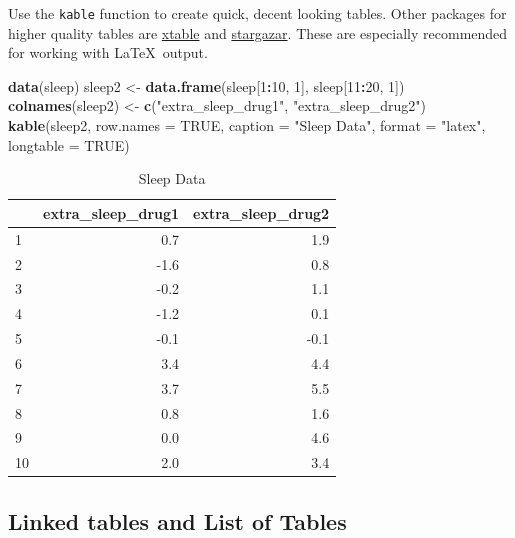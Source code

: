 \documentclass[12pt,oneside]{chicagocapstone}
\newenvironment{Shaded}{\begin{snugshade}}{\end{snugshade}}
\newcommand{\DataTypeTok}[1]{\textcolor[rgb]{0.13,0.29,0.53}{#1}}
\newcommand{\DecValTok}[1]{\textcolor[rgb]{0.00,0.00,0.81}{#1}}
\newcommand{\KeywordTok}[1]{\textcolor[rgb]{0.13,0.29,0.53}{\textbf{#1}}}
\newcommand{\NormalTok}[1]{#1}
\newcommand{\OperatorTok}[1]{\textcolor[rgb]{0.81,0.36,0.00}{\textbf{#1}}}
\newcommand{\OtherTok}[1]{\textcolor[rgb]{0.56,0.35,0.01}{#1}}
\newcommand{\StringTok}[1]{\textcolor[rgb]{0.31,0.60,0.02}{#1}}
\begin{document}
Use the \texttt{kable} function to create quick, decent looking tables. Other packages for higher quality tables are \href{https://cran.r-project.org/web/packages/xtable/index.html}{xtable} and \href{https://cran.r-project.org/web/packages/stargazer/index.html}{stargazar}. These are especially recommended for working with \LaTeX~output.
\begin{Shaded}
\begin{Highlighting}[]
\KeywordTok{data}\NormalTok{(sleep)}
\NormalTok{sleep2 <-}\StringTok{ }\KeywordTok{data.frame}\NormalTok{(sleep[}\DecValTok{1}\OperatorTok{:}\DecValTok{10}\NormalTok{, }\DecValTok{1}\NormalTok{], sleep[}\DecValTok{11}\OperatorTok{:}\DecValTok{20}\NormalTok{, }\DecValTok{1}\NormalTok{])}
\KeywordTok{colnames}\NormalTok{(sleep2) <-}\StringTok{ }\KeywordTok{c}\NormalTok{(}\StringTok{"extra_sleep_drug1"}\NormalTok{, }\StringTok{"extra_sleep_drug2"}\NormalTok{)}
\KeywordTok{kable}\NormalTok{(sleep2, }\DataTypeTok{row.names =} \OtherTok{TRUE}\NormalTok{, }\DataTypeTok{caption =} \StringTok{"Sleep Data"}\NormalTok{, }
              \DataTypeTok{format =} \StringTok{"latex"}\NormalTok{, }\DataTypeTok{longtable =} \OtherTok{TRUE}\NormalTok{)}
\end{Highlighting}
\end{Shaded}
\begin{longtable}[t]{l|r|r}
\caption{\label{tab:sleep}Sleep Data}\\
\hline
  & extra\_sleep\_drug1 & extra\_sleep\_drug2\\
\hline
1 & 0.7 & 1.9\\
\hline
2 & -1.6 & 0.8\\
\hline
3 & -0.2 & 1.1\\
\hline
4 & -1.2 & 0.1\\
\hline
5 & -0.1 & -0.1\\
\hline
6 & 3.4 & 4.4\\
\hline
7 & 3.7 & 5.5\\
\hline
8 & 0.8 & 1.6\\
\hline
9 & 0.0 & 4.6\\
\hline
10 & 2.0 & 3.4\\
\hline
\end{longtable}
\hypertarget{linked-tables-and-list-of-tables}{%
\subsection*{Linked tables and List of Tables}\label{linked-tables-and-list-of-tables}}
\end{document}
